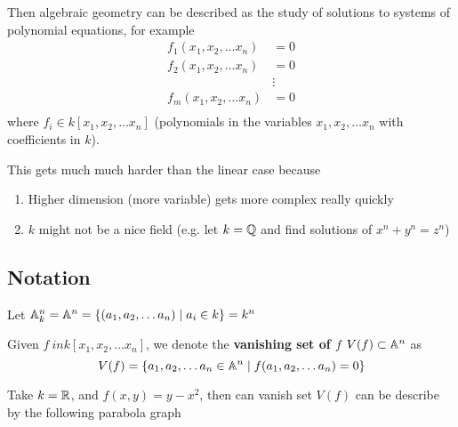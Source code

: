 Then algebraic geometry can be described as the study of solutions to systems of polynomial equations, for example 
\begin{align*}
f_1(x_1, x_2, \ldots x_n) &= 0 \\
f_2(x_1, x_2, \ldots x_n) &= 0 \\
&\vdots \\
f_m(x_1, x_2, \ldots x_n) &= 0 \\
\end{align*}
where $f_i \in k[x_1, x_2, \ldots x_n]$ (polynomials in the variables $x_1, x_2, \ldots x_n$ with coefficients in $k$). 

This gets much much harder than the linear case because
\begin{enumerate}
	\item Higher dimension (more variable) gets more complex really quickly
	\item $k$ might not be a nice field (e.g. let $k = \mathbb Q$ and find solutions of  $x^n + y^n = z^n$)
\end{enumerate}

\subsection{Notation}
\begin{definition}
	Let $\mathbb A^n_k = \mathbb A^n = \left\{ (a_1, a_2, \ldots a_n ) \mid a_i \in k \right\} = k^n$
\end{definition}

\begin{definition}
Given $f \ in k[x_1, x_2, \ldots x_n]$, we denote the \textbf{vanishing set of $f$} $V(f) \subset \mathbb A^n$ as
\[ V(f) = \left\{ a_1, a_2, \ldots a_n \in \mathbb A^n \mid f(a_1, a_2, \ldots a_n) = 0 \right\}\]
\end{definition}

\begin{example}
Take $k = \mathbb R$, and $f(x,y) = y - x^2$, then can vanish set $V(f)$ can be describe by the following parabola
graph	
\begin{center}
\end{center}
\end{example}

